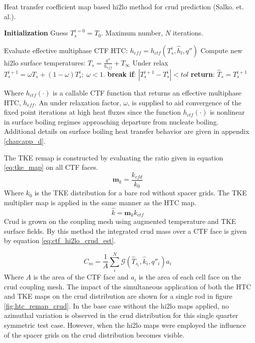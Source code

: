     \begin{algorithm}[H]
        \caption{Heat transfer coefficient map based hi2lo method for crud prediction (Salko. et. al.).}
    \begin{algorithmic}[1]
    \STATE \textbf{Initialization} 
    \STATE Guess $T^{i=0}_s=T_0$.  Maximum number, $N$ iterations.

           \STATE Evaluate effective multiphase CTF HTC: $h_{eff} = h_{{ctf}}(T^i_{s}, \hat h_l, q'')$ \;
           \STATE Compute new hi2lo surface temperatures: $T_{s} = \frac{q''}{h_{eff}} + T_\infty$ \;
           \STATE  Under relax  $T^{i+1}_{s} = \omega T_{s} + (1 - \omega) T^{i}_{s} ;\ \omega < 1.$ \;
           \STATE  \textbf{break if}:  $|T^{i+1}_s - T^i_s| < tol$ \;
        \ENDFOR 
    \STATE \textbf{return}: $\hat T_s = T^{i+1}_s$
    \end{algorithmic}
    \label{alg:salko_hi2lo_alg}
    \end{algorithm}
    Where $h_{ctf}(\cdot)$ is a callable CTF function that returns an effective multiphase HTC, $h_{eff}$.  An under relaxation factor, $\omega$, is supplied to aid convergence of the fixed point iterations at high heat fluxes since the function $h_{ctf}(\cdot)$ is nonlinear in surface boiling regimes approaching departure from nucleate boiling.  Additional details on surface boiling heat transfer behavior are given in appendix \ref{chap:app_d}.

    The TKE remap is constructed by evaluating the ratio given in equation \ref{eq:tke_map} on all CTF faces.
    \begin{equation}
       \mathbf m_{k} = \frac{k_{cfd}}{k_{0}}
       \label{eq:tke_map}
    \end{equation}
    Where $k_0$ is the TKE distribution for a bare rod without spacer grids.
    The TKE multiplier map is applied in the same manner as the HTC map.
       \begin{equation}
       \hat k = \mathbf m_k k_{ctf}
       \end{equation}
Crud is grown on the coupling mesh using augmented temperature and TKE surface fields. By this method the integrated crud mass over a CTF face is given by equation \ref{eq:ctf_hi2lo_crud_est}.

 \begin{equation}
     C_m = \frac{1}{A} \sum_i^N \mathcal G(\hat T_{s_i}, \hat k_i, q''_i) a_i
 \label{eq:ctf_hi2lo_crud_est}
 \end{equation}
Where $A$ is the area of the CTF face and $a_i$ is the area of each cell face on the crud coupling mesh.  The impact of the simultaneous application of both the HTC and TKE maps on the crud distribution are shown for a single rod in figure \ref{fig:htc_remap_crud}.  In the base case without the hi2lo maps applied, no azimuthal variation is observed in the crud distribution for this single quarter symmetric test case.  However, when the hi2lo maps were employed the influence of the spacer grids on the crud distribution becomes visible.  

